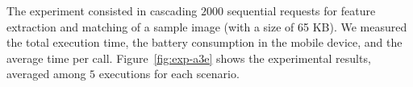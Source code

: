 The experiment consisted in cascading $2000$ sequential requests for feature extraction and matching of a sample image (with a size of 65 KB). We measured the total execution time, the battery consumption in the mobile device, and the average time per call. Figure~\ref{fig:exp-a3e} shows the experimental results, averaged among $5$ executions for each scenario.

